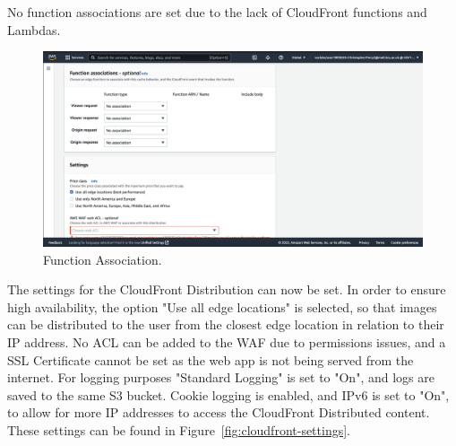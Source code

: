 No function associations are set due to the lack of CloudFront functions and Lambdas.

\begin{figure}[!htbp]
    \centering
    \includegraphics[width=\textwidth]{resources/cloudfront/cloudfront-function-association}
    \caption{Function Association.}
    \label{fig:cloudfront-function-association}
\end{figure}

\clearpage
The settings for the CloudFront Distribution can now be set.
In order to ensure high availability, the option "Use all edge locations" is selected, so that images can be distributed
to the user from the closest edge location in relation to their IP address.
No ACL can be added to the WAF due to permissions issues, and a SSL Certificate cannot be set as the web app is not being
served from the internet.
For logging purposes "Standard Logging" is set to "On", and logs are saved to the same S3 bucket.
Cookie logging is enabled, and IPv6 is set to "On", to allow for more IP addresses to access the CloudFront Distributed
content.
These settings can be found in Figure~\ref{fig:cloudfront-settings}.

